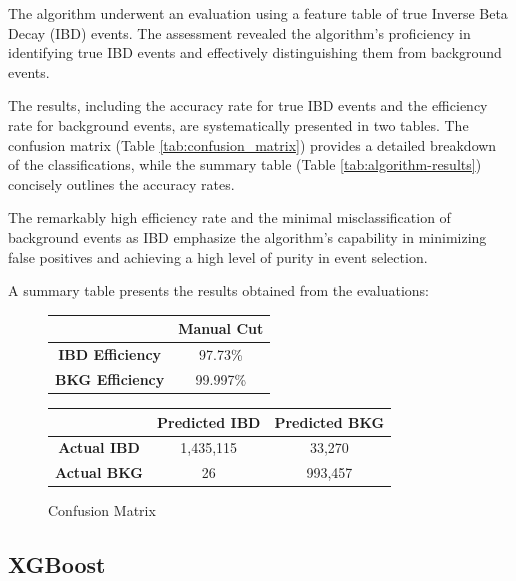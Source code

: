 The algorithm underwent an evaluation using a feature table of true Inverse Beta Decay (IBD) events. The assessment revealed the algorithm's proficiency in identifying true IBD events and effectively distinguishing them from background events.

The results, including the accuracy rate for true IBD events and the efficiency rate for background events, are systematically presented in two tables. The confusion matrix (Table \ref{tab:confusion_matrix}) provides a detailed breakdown of the classifications, while the summary table (Table \ref{tab:algorithm-results}) concisely outlines the accuracy rates.

The remarkably high efficiency rate and the minimal misclassification of background events as IBD emphasize the algorithm's capability in minimizing false positives and achieving a high level of purity in event selection.
       

A summary table presents the results obtained from the evaluations:


\begin{figure}[h]
	\centering
	\begin{minipage}{0.3\textwidth}
		\begin{tabular}{cc}
			\toprule
			 & \textbf{Manual Cut} \\ 
			\midrule
			\textbf{IBD Efficiency} &  97.73\% \\ 
			\textbf{BKG Efficiency} &  99.997\% \\ 
			\bottomrule
		\end{tabular}
	\end{minipage}
	\hspace{0.05\textwidth}
	\begin{minipage}{0.6\textwidth}
		\centering
		\begin{tabular}{ccc}
			\toprule
			& \textbf{Predicted IBD} & \textbf{Predicted BKG} \\
			\midrule
			\textbf{Actual IBD} & 1,435,115 & 33,270 \\
			\textbf{Actual BKG} & 26 & 993,457 \\
			\bottomrule
		\end{tabular}
		\caption{Confusion Matrix}
	\label{tab:confusion_matrix_cut}
	\end{minipage}
\end{figure}

\subsection{XGBoost}

